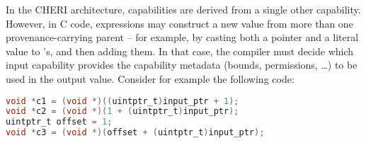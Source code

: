 \documentclass[12pt,twoside,openright,usletter]{article}
\newcommand{\ccode}[1]{{\small\ttfamily{#1}}}
\newcommand{\cintptrt}{{\ccode{intptr\_t}}\xspace}
\newcommand{\note}[2]{{\color{blue}[ Note: #1 - #2]}}
\renewcommand{\note}[2]{\relax\ifhmode\unskip\fi}
\newcommand{\psnote}[1]{\note{#1}{Peter S.}}
\begin{document}
In the\psnote{singular ``the'', or ``CHERI architectures''?}  CHERI architecture, capabilities are derived from a single other
capability.
However, in C code, expressions may construct a new \cintptrt value from more
than one provenance-carrying parent \cintptrt{} -- for example, by casting both a
pointer and a literal value to \cintptrt{}'s, and then adding them.
\psnote{That literal value wouldn't have a non-empty provenance, so this isn't the best example.   Maybe better to have something like \texttt{p+(q1-q2)} ?}
\psnote{More generally, there is a bit of a mismatch between this and our C provenance treatment of \cintptrt, which there is a plain integer type with no provenance -- but which regains provenance in some cases when cast back to a pointer.  To ponder...}
In that case, the compiler must decide which input capability provides the
capability metadata (bounds, permissions, \ldots{}) to be used in the output
value.
Consider for example the following code:
\begin{lstlisting}[language=C]
void *c1 = (void *)((uintptr_t)input_ptr + 1);
void *c2 = (void *)(1 + (uintptr_t)input_ptr);
uintptr_t offset = 1;
void *c3 = (void *)(offset + (uintptr_t)input_ptr);
\end{lstlisting}
\end{document}
